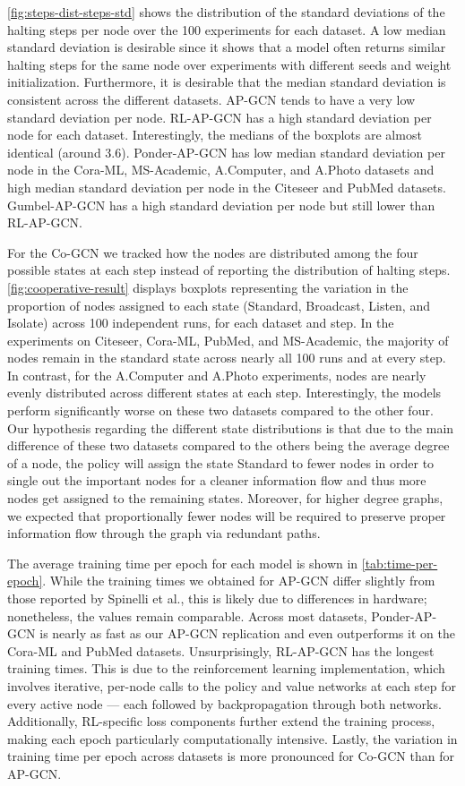 \documentclass{gdl}
\begin{document}
\autoref{fig:steps-dist-steps-std} shows the distribution of the standard deviations of the halting steps per node over the 100 experiments for each dataset. A low median standard deviation is desirable since it shows that a model often returns similar halting steps for the same node over experiments with different seeds and weight initialization. Furthermore, it is desirable that the median standard deviation is consistent across the different datasets. AP-GCN tends to have a very low standard deviation per node. RL-AP-GCN has a high standard deviation per node for each dataset. Interestingly, the medians of the boxplots are almost identical (around 3.6). Ponder-AP-GCN has low median standard deviation per node in the Cora-ML, MS-Academic, A.Computer, and A.Photo datasets and high median standard deviation per node in the Citeseer and PubMed datasets. Gumbel-AP-GCN has a high standard deviation per node but still lower than RL-AP-GCN. 

For the Co-GCN we tracked how the nodes are distributed among the four possible states at each step instead of reporting the distribution of halting steps. \autoref{fig:cooperative-result} displays boxplots representing the variation in the proportion of nodes assigned to each state (Standard, Broadcast, Listen, and Isolate) across 100 independent runs, for each dataset and step. In the experiments on Citeseer, Cora-ML, PubMed, and MS-Academic, the majority of nodes remain in the standard state across nearly all 100 runs and at every step. In contrast, for the A.Computer and A.Photo experiments, nodes are nearly evenly distributed across different states at each step. Interestingly, the models perform significantly worse on these two datasets compared to the other four. Our hypothesis regarding the different state distributions is that due to the main difference of these two datasets compared to the others being the average degree of a node, the policy will assign the state Standard to fewer nodes in order to single out the important nodes for a cleaner information flow and thus more nodes get assigned to the remaining states. Moreover, for higher degree graphs, we expected that proportionally fewer nodes will be required to preserve proper information flow through the graph via redundant paths.

The average training time per epoch for each model is shown in \autoref{tab:time-per-epoch}. While the training times we obtained for AP-GCN differ slightly from those reported by Spinelli et al., this is likely due to differences in hardware; nonetheless, the values remain comparable. Across most datasets, Ponder-AP-GCN is nearly as fast as our AP-GCN replication and even outperforms it on the Cora-ML and PubMed datasets. Unsurprisingly, RL-AP-GCN has the longest training times. This is due to the reinforcement learning implementation, which involves iterative, per-node calls to the policy and value networks at each step for every active node --- each followed by backpropagation through both networks. Additionally, RL-specific loss components further extend the training process, making each epoch particularly computationally intensive. Lastly, the variation in training time per epoch across datasets is more pronounced for Co-GCN than for AP-GCN.
\end{document}
